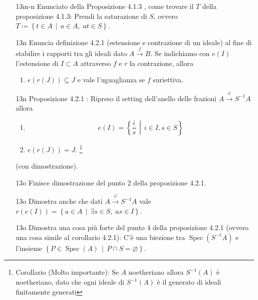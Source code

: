 \documentclass[italian]{article}
\begin{document}
\begin{enumerate}
       \item[13m-n] Enunciato della Proposizione 4.1.3 \cite{vergura}, come
         trovare il $T$ della proposizione 4.1.3: Prendi la saturazione di $S$,
         ovvero $T \coloneqq \left\{ t \in A \,\middle|\, a \in
         A, \; at \in S \right\}$.
       \item[13n] Enuncia definizione 4.2.1 \cite{vergura} (estensione
         e contrazione di un ideale) al fine di stabilire
         i rapporti tra gli ideali dato $A  B$. Se indichiamo con
         $e(I)$ l'estensione di $I \subset A$ attraverso $f$ e $r$ la
         contrazione, allora
         \begin{enumerate}
           \item $e(r(J)) \subseteq J$ e vale l'uguaglianza se $f$ suriettiva.
         \end{enumerate}
       \item[13n] Proposizione 4.2.1 \cite{vergura}: Ripreso il setting dell'anello 
         delle frazioni $A \xrightarrow{\varphi} S^{-1}A$ allora
         \begin{enumerate}
           \item \begin{equation*}
               e(I) = \left\{ \frac{i}{s} \,\middle|\, i \in I, s\in S \right\}
             \end{equation*}
           \item $e(r(J)) = J$. \footnote{Corollario (Molto importante): Se 
               $A$ noetheriano allora $S^{-1}(A)$ è noetheriano, dato che 
               ogni ideale di $S^{-1}(A)$ è il generato di ideali finitamente 
             generati} 
         \end{enumerate}
         (con dimostrazione).
       \item[13o] Finisce dimostrazione del punto 2 della proposizione 4.2.1.
       \item[13o] Dimostra anche che dati $A \xrightarrow{\varphi} S^{-1}A$ vale
         $r(e(I)) = \left\{ a \in A \,\middle|\, \exists s \in S, \; as \in I 
         \right\}$.
       \item[13o] Dimostra una cosa più forte del punto $4$ della proposizione 
         4.2.1 (ovvero una cosa simile al corollario 4.2.1): C'è una biezione tra 
         $(S^{-1}A)$ e l'insieme
         $\left\{ P \in {}(A)\, \middle|\, P \cap
         S = \varnothing \right\}$.
	\end{enumerate}  
\end{document}

